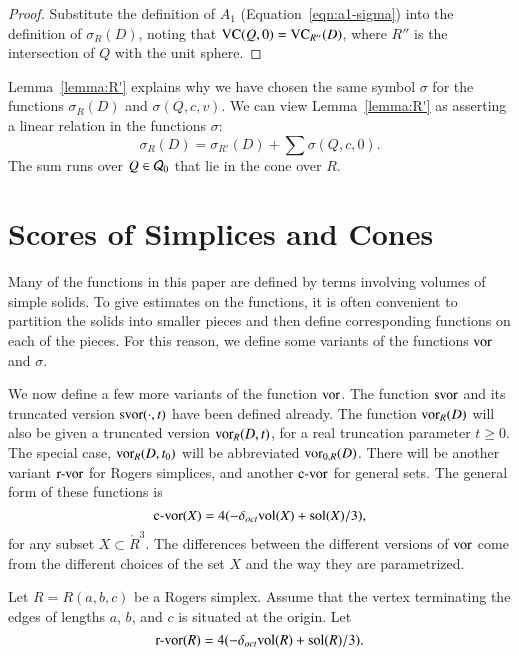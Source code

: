 \begin{proof} Substitute the definition of $A_1$
(Equation~\ref{eqn:a1-sigma}) into the definition of
$\sigma_R(D)$, noting that ${\operatorname{VC}}(Q,0) = {\operatorname{VC}}_{R''}(D)$,
where $R''$ is the intersection of $Q$ with the unit sphere.
\end{proof}

\begin{remark}   Lemma~\ref{lemma:R'} explains why we have chosen
the same symbol $\sigma$ for the functions $\sigma_R(D)$ and
$\sigma(Q,c,v)$.  We can view Lemma~\ref{lemma:R'} as asserting a
linear relation in the functions $\sigma$:
   $$\sigma_R(D) = \sigma_{R'}(D) + \sum \sigma(Q,c,0).$$
The sum runs over $Q\in{\mathcal Q}_0$ that lie in the cone over $R$.
\end{remark}

\section{Scores of Simplices and Cones}

Many of the functions in this paper are defined by terms involving
volumes of simple solids.  To give estimates on the functions, it
is often convenient to partition the solids into smaller pieces
and then define corresponding functions on each of the pieces. For
this reason, we define some variants of the functions $\operatorname{vor}$ and
$\sigma$.

\begin{remark}\label{remark:vor}
We now define a few more variants of the function $\operatorname{vor}$. The
function $\operatorname{svor}$ and its truncated version  $\operatorname{svor}(\cdot,t)$ have
been defined already. The function $\operatorname{vor}_R(D)$ will also be given
a truncated version $\operatorname{vor}_R(D,t)$, for a real truncation parameter
$t\ge 0$. The special case, $\operatorname{vor}_R(D,t_0)$ will be abbreviated
$\operatorname{vor}_{0,R}(D)$. There will be another variant ${\operatorname{r-vor}}$ for
Rogers simplices, and another ${\operatorname{c-vor}}$ for general sets.  The
general form of these functions is
    $${\operatorname{c-vor}}(X) = 4 (-\delta_{oct}{\operatorname{vol}}(X) + \operatorname{sol}(X)/3),$$
for any subset $X\subset \ring{R}^3$.   The differences between
the different versions of $\operatorname{vor}$ come from the different choices
of the set $X$ and the way they are parametrized.
\end{remark}

\begin{definition}  \label{def:r-vor}
Let $R=R(a,b,c)$ be a Rogers simplex. Assume that the vertex
terminating the edges of lengths $a$, $b$, and $c$ is situated at
the origin. Let
    $${\operatorname{r-vor}}(R) = 4 (-\delta_{oct}{\operatorname{vol}}(R) + \operatorname{sol}(R)/3).$$
\end{definition}


